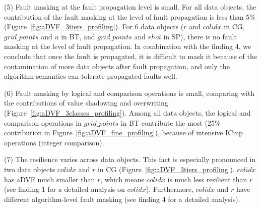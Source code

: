 
(5) Fault masking at the fault propagation level is small.
For all data objects, the contribution of the fault masking at the level of fault propagation is less than 5\% (Figure~\ref{fig:aDVF_3tiers_profiling}).
For 6 data objects ($r$ and $colidx$ in CG, $grid\_points$ and $u$ in BT, and 
$grid\_points$ and $rhoi$ in SP),  there is no fault masking at the level of fault propagation.
In combination with the finding 4, we conclude that once the fault
is propagated, it is difficult to mask it because of the contamination of
more data objects after fault propagation, and only the algorithm semantics can tolerate  propagated faults well. 

(6) Fault masking by logical and comparison operations is small,
comparing with the contributions of value shadowing and overwriting (Figure~\ref{fig:aDVF_3classes_profiling}). 
Among all data objects, 
the logical and comparison operations in $grid\_points$ in BT contribute the most (25\% contribution in Figure~\ref{fig:aDVF_fine_profiling}), 
because of intensive ICmp operations (integer comparison). %


(7) The resilience varies across data objects. %
This fact is especially pronounced in two data objects $colidx$ and $r$ in CG (Figure~\ref{fig:aDVF_3tiers_profiling}).
 $colidx$ has aDVF much smaller than $r$, which means $colidx$ is much less resilient than $r$ (see finding 1 for a detailed analysis on $colidx$). 
Furthermore, $colidx$ and $r$ have different algorithm-level
fault masking (see finding 4 for a detailed analysis).

\begin{comment}
\textbf{Finding 7: The resilience of the same data objects varies across different applications.}
This fact is especially pronounced in BT and SP.
BT and SP address the same numerical problem but with different algorithms.
BT and SP have the same data objects, $qs$ and $rhoi$, but
$qs$ manifests different resilience in BT and SP.
This result is interesting, because it indicates that by using
different algorithms, we have opportunities to
improve the resilience of data objects.
\end{comment}

